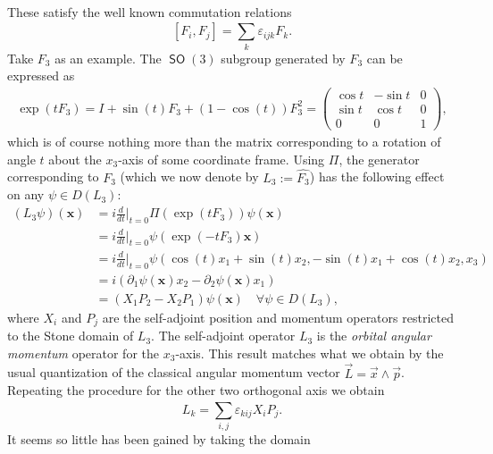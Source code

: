 \documentclass[a4paper]{article}
\DeclareMathOperator{\SO}{\mathsf{SO}}
\begin{document}
    These satisfy the well known commutation relations 
    \begin{equation}
        \label{eqn:so(3)-comm}
        [F_i, F_j]
        =
        \sum_{k}^{} \varepsilon_{ijk} F_k.
    \end{equation}
    Take $F_3$ as an example. The $\SO(3)$ subgroup
    generated by $F_3$ can be expressed as
    \begin{align}
        \exp(t F_3)
        =
        I + \sin(t) F_3 + (1-\cos(t)) F_3^2
        = 
        \begin{pmatrix} 
            \cos t & -\sin t & 0 \\
            \sin t & \cos t & 0 \\
            0 & 0 & 1
        \end{pmatrix}, 
    \end{align}
    which is of course nothing more than the matrix
    corresponding to a rotation of angle $t$ about the
    $x_3$-axis of some coordinate frame. Using $\Pi$, the
    generator  corresponding to $F_3$ (which we now denote
    by $L_3 := \hat{F_3}$) has the following effect on any
    $\psi \in D(L_3)$:
    \begin{align}
        (L_3\psi)(\bm x)
        &= i \frac{d}{dt}\bigg|_{t=0}\Pi(\exp(t
        F_3))\psi(\bm x) \\
        &= i \frac{d}{dt}\bigg|_{t=0} \psi(\exp(-t F_3) \bm
        x) \\
        &= i \frac{d}{dt}\bigg|_{t=0} \psi(\cos(t) x_1 +
        \sin(t) x_2, -\sin(t) x_1 + \cos(t) x_2, x_3) \\
        &= i \left(
            \partial_1 \psi(\bm x) x_2 - \partial_2
            \psi(\bm x) x_1
        \right) \\
        &= (X_1 P_2 - X_2 P_1)\psi(\bm x) 
        \quad
        \forall \psi \in D(L_3),
    \end{align}
    where $X_i$ and $P_j$ are the self-adjoint position and
    momentum operators restricted to the Stone domain of
    $L_3$.  The self-adjoint operator $L_3$ is the
    \textit{orbital angular momentum} operator for the
    $x_3$-axis. This result matches what we obtain by the
    usual quantization of the classical angular momentum
    vector $\vec L = \vec x \wedge \vec p$. Repeating the
    procedure for the other two orthogonal axis we obtain
    \begin{equation}
        L_k
        =
        \sum_{i,j}^{} \varepsilon_{kij} X_i P_j.
    \end{equation}
    It seems so little has been gained by taking the domain
\end{document}
